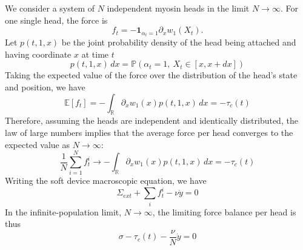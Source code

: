 \documentclass{article}
\begin{document}
We consider a system of $N$ independent myosin heads in the limit $N \to \infty$. For one single head, the force is 
\begin{equation}
    f_t=-\mathbf 1_{\alpha_t=1}\partial_xw_1(X_t).
\end{equation}
Let $p(t, 1, x)$ be the joint probability density of the head being attached and having coordinate $x$ at time $t$
\begin{equation}
    p(t,1,x)\,dx
=\mathbb P(\alpha_t=1,\ X_t\in[x,x+dx])
\end{equation}
Taking the expected value of the force over the distribution of the head's state and position, we have
\begin{equation}
    \mathbb E[f_t]
=-\int_{\mathbb R}\partial_xw_1(x)p(t,1,x)\,dx = -\tau_c(t)
\end{equation}
Therefore, assuming the heads are independent and identically distributed, the law of large numbers implies that the average force per head converges to the expected value as $N \to \infty$:
\begin{equation}
\frac1N\sum_{i=1}^N f_t^i
\longrightarrow -\int_{\mathbb R}\partial_xw_1(x)p(t,1,x)\,dx =-\tau_c(t)
\end{equation}
Writing the soft device macroscopic equation, we have 
\begin{equation}
    \Sigma_{ext} + \sum_i f_t^i - \nu \dot{y}= 0 
\end{equation}
In the infinite-population limit, $N \to \infty$, the limiting force balance per head is thus 
\begin{equation}
    \sigma - \tau_c(t) - \frac{\nu}{N}\dot{y} = 0
\end{equation}
\end{document}
